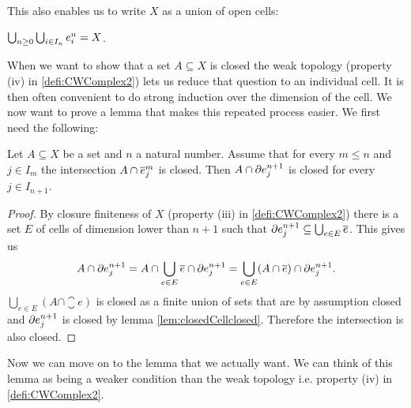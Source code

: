 This also enables us to write $X$ as a union of open cells:

\begin{cor} \label{cor:complexeqopencells}
    $\bigcup_{n \ge 0}\bigcup_{i \in I_n} \openCell{n}{i} = X$.
\end{cor}

When we want to show that a set $A \subseteq X$ is closed the weak topology (property (iv) in \ref{defi:CWComplex2}) lets us reduce that question to an individual cell.
It is then often convenient to do strong induction over the dimension of the cell.
We now want to prove a lemma that makes this repeated process easier.
We first need the following:

\begin{lem}\label{lem:inductioncellFrontierclosed}
    Let $A \subseteq X$ be a set and $n$ a natural number.
    Assume that for every $m \le n$ and $j \in I_m$ the intersection $A \cap \closedCell{m}{j}$ is closed.
    Then $A \cap \cellFrontier{n + 1}{j}$ is closed for every $j \in I_{n + 1}$.
\end{lem}
\begin{proof}
    By closure finiteness of $X$ (property (iii) in \ref{defi:CWComplex2}) there is a set $E$ of cells of dimension lower than $n + 1$ such that $\cellFrontier{n + 1}{j} \subseteq \bigcup_{e \in E}\closure{e}$.
    This gives us
    \[A \cap \cellFrontier{n + 1}{j} = A \cap \bigcup_{e \in E}\closure{e} \cap \cellFrontier{n + 1}{j} = \bigcup_{e \in E}(A \cap \closure{e}) \cap \cellFrontier{n + 1}{j}.\]
    $\bigcup_{e \in E}(A \cap \closure{e})$ is closed as a finite union of sets that are by assumption closed and $\cellFrontier{n + 1}{j}$ is closed by lemma \ref{lem:closedCellclosed}. Therefore the intersection is also closed.
\end{proof}

Now we can move on to the lemma that we actually want.
We can think of this lemma as being a weaker condition than the weak topology i.e. property (iv) in \ref{defi:CWComplex2}.

